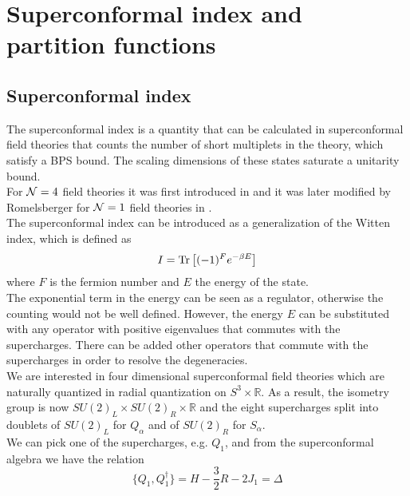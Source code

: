 

\chapter{Superconformal index and \\ partition functions}



\section{Superconformal index}
The superconformal index is a quantity that can be calculated in superconformal field theories that counts the number of short multiplets in the theory, which satisfy a BPS bound.
The scaling dimensions of these states saturate a unitarity bound.\\
For $\mathcal{N}=4$ field theories it was first introduced in \cite{Kinney:2005ej}
and it was later modified by Romelsberger for $\mathcal{N}=1$ field theories in \cite{Romelsberger:2005eg}.\\
The superconformal index can be introduced as a generalization of the Witten index, which is defined as 
\begin{equation}
I = \mathrm{Tr } \,{ \left[   (-1)^F e^{-\beta E}\right]}
\end{equation}
where $F$ is the fermion number and $E$ the energy of the state.\\
The exponential term in the energy can be seen as a regulator, otherwise the counting would not be well defined.
However, the energy $E$ can be substituted with any operator with positive eigenvalues that commutes with the supercharges. 
There can be added other operators that commute with the supercharges in order to resolve the degeneracies.
\\
We are interested in four dimensional superconformal field theories which are naturally quantized in radial quantization on $S^3 \times \mathbb{R}$. 
As a result, the isometry group is now $SU(2)_L \times SU(2)_R \times \mathbb{R}$ and the eight supercharges split into doublets of $SU(2)_L$ for $Q_{\alpha}$ and of $SU(2)_R$ for $S_{\alpha}$.\\
We can pick one of the supercharges, e.g. $Q_1$, and from the superconformal algebra we have the relation
\begin{equation}
 \{Q_1, Q_1^{\dagger} \} = H - \frac{3}{2} R - 2 J_1 = \Delta
 \end{equation} 
